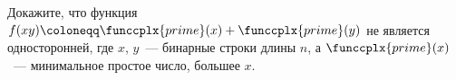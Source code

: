 Докажите, что функция $f(xy) \coloneqq \funccplx{prime}(x) + \funccplx{prime}(y)$ не является
односторонней, где $x$, $y$~--- бинарные строки длины $n$, а $\funccplx{prime}(x)$~--- минимальное
простое число, большее $x$.